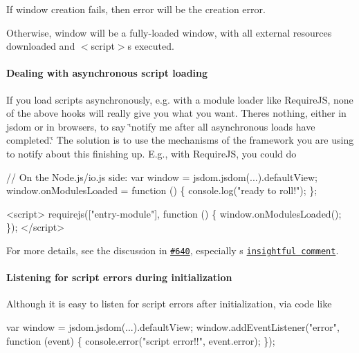 \begin{DoxyItemize}
\item If window creation fails, then {\ttfamily error} will be the creation error.
\item Otherwise, {\ttfamily window} will be a fully-\/loaded window, with all external resources downloaded and {\ttfamily $<$script$>$}s executed.
\end{DoxyItemize}

\paragraph*{Dealing with asynchronous script loading}

If you load scripts asynchronously, e.\+g. with a module loader like Require\+JS, none of the above hooks will really give you what you want. There\textquotesingle{}s nothing, either in jsdom or in browsers, to say \char`\"{}notify me after all asynchronous loads have completed.\char`\"{} The solution is to use the mechanisms of the framework you are using to notify about this finishing up. E.\+g., with Require\+JS, you could do


\begin{DoxyCode}
// On the Node.js/io.js side:
var window = jsdom.jsdom(...).defaultView;
window.onModulesLoaded = function () \{
  console.log("ready to roll!");
\};
\end{DoxyCode}



\begin{DoxyCode}
<script>
requirejs(["entry-module"], function () \{
  window.onModulesLoaded();
\});
</script>
\end{DoxyCode}


For more details, see the discussion in \href{https://github.com/tmpvar/jsdom/issues/640}{\tt \#640}, especially \href{https://github.com/matthewkastor}{\tt }\textquotesingle{}s \href{https://github.com/tmpvar/jsdom/issues/640#issuecomment-22216965}{\tt insightful comment}.

\paragraph*{Listening for script errors during initialization}

Although it is easy to listen for script errors after initialization, via code like


\begin{DoxyCode}
var window = jsdom.jsdom(...).defaultView;
window.addEventListener("error", function (event) \{
  console.error("script error!!", event.error);
\});
\end{DoxyCode}



